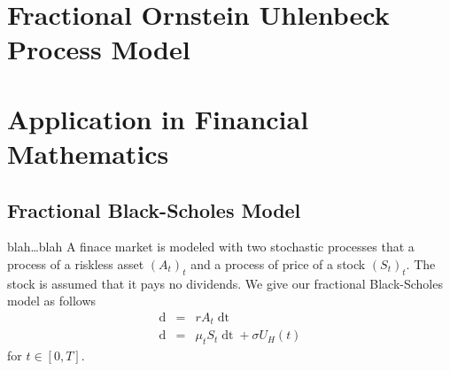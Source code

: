 \documentclass[a4paper, twoside, 11pt]{article}
\theoremstyle{definition}
\newtheorem{definition}{\scshape Definition}[section]
\newtheorem{theorem}[definition]{\scshape Theorem}
\begin{document}



\newpage
\section{Fractional Ornstein Uhlenbeck Process Model}
\setcounter{equation}{0}
\newpage

\section{Application in Financial Mathematics}
\setcounter{equation}{0}
\subsection{Fractional Black-Scholes Model}
blah\dots blah
A finace market is modeled with two stochastic processes that a process of a riskless asset $(A_t)_t$ and a process of price of a stock $(S_t)_t$.  The stock is assumed that it pays no dividends. We give our fractional Black-Scholes model as follows
\begin{eqnarray}
  \mathop{dA_t} &=& rA_t\mathop{dt}\nonumber\\
  \mathop{dS_t} &=& \mu_t S_t \mathop{dt} + \sigma U_H(t)
  \label{sec:fbs1}
\end{eqnarray}
for $t\in [0, T]$.
\end{document}
